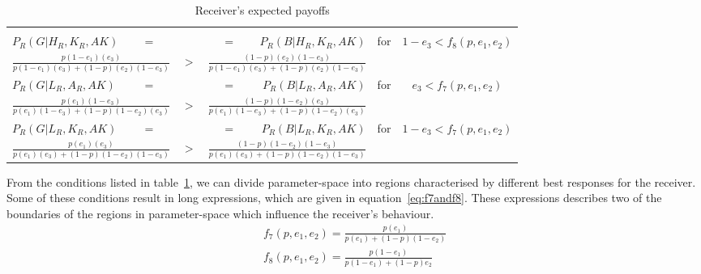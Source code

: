 \documentclass[a4paper,12pt]{article}
\numberwithin{equation}{section}
\begin{document}
\begin{table}[h]
\begin{center}
\begin{tabular}{lcccccrcc}
\vspace{1mm}\\
$P_{R}(G|H_{R},K_{R},AK)$ & $=$ & & & & $=$ & $P_{R}(B|H_{R},K_{R},AK)$ & \multirow{2}{*}{for} & \multirow{2}{*}{$1-e_{3}<f_{8}(p,e_{1},e_{2})$}
\vspace{-1mm}\\
\multicolumn{3}{r}{$\frac{p(1-e_{1})(e_{3})}{p(1-e_{1})(e_{3})+(1-p)(e_{2})(1-e_{3})}$} & $>$ & \multicolumn{3}{l}{$\frac{(1-p)(e_{2})(1-e_{3})}{p(1-e_{1})(e_{3})+(1-p)(e_{2})(1-e_{3})}$} &
\vspace{1mm}\\
$P_{R}(G|L_{R},A_{R},AK)$ & $=$ & & & & $=$ & $P_{R}(B|L_{R},A_{R},AK)$ & \multirow{2}{*}{for} & \multirow{2}{*}{$e_{3}<f_{7}(p,e_{1},e_{2})$}
\vspace{-1mm}\\
\multicolumn{3}{r}{$\frac{p(e_{1})(1-e_{3})}{p(e_{1})(1-e_{3})+(1-p)(1-e_{2})(e_{3})}$} & $>$ & \multicolumn{3}{l}{$\frac{(1-p)(1-e_{2})(e_{3})}{p(e_{1})(1-e_{3})+(1-p)(1-e_{2})(e_{3})}$} &
\vspace{1mm}\\
$P_{R}(G|L_{R},K_{R},AK)$ & $=$ & & & & $=$ & $P_{R}(B|L_{R},K_{R},AK)$ & \multirow{2}{*}{for} & \multirow{2}{*}{$1-e_{3}<f_{7}(p,e_{1},e_{2})$}
\vspace{-1mm}\\
\multicolumn{3}{r}{$\frac{p(e_{1})(e_{3})}{p(e_{1})(e_{3})+(1-p)(1-e_{2})(1-e_{3})}$} & $>$ & \multicolumn{3}{l}{$\frac{(1-p)(1-e_{2})(1-e_{3})}{p(e_{1})(e_{3})+(1-p)(1-e_{2})(1-e_{3})}$} &
\end{tabular}
\end{center}
\caption{Receiver's expected payoffs}
\label{tab:CueGamewithObservableAmplification/ConditionalPayoffsR}
\end{table}

From the conditions listed in table~\ref{tab:CueGamewithObservableAmplification/ConditionalPayoffsR}, we can divide parameter-space into regions characterised by different best responses for the receiver. Some of these conditions result in long expressions, which are given in equation~\ref{eq:f7andf8}. These expressions describes two of the boundaries of the regions in parameter-space which influence the receiver's behaviour.
\begin{subequations}
\label{eq:f7andf8}
\begin{gather}
f_{7}(p,e_{1},e_{2})=\frac{p(e_{1})}{p(e_{1})+(1-p)(1-e_{2})}\\
f_{8}(p,e_{1},e_{2})=\frac{p(1-e_{1})}{p(1-e_{1})+(1-p)e_{2}}
\end{gather}
\end{subequations}
\end{document}

